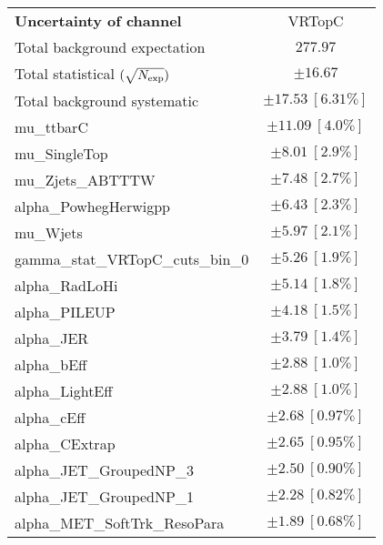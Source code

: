 
\begin{table}
\begin{center}
\setlength{\tabcolsep}{0.0pc}
\begin{tabular*}{\textwidth}{@{\extracolsep{\fill}}lc}
\noalign{\smallskip}\hline\noalign{\smallskip}
{\bf Uncertainty of channel}                                    & VRTopC            \\
\noalign{\smallskip}\hline\noalign{\smallskip}
Total background expectation             &  $277.97$       \\
\noalign{\smallskip}\hline\noalign{\smallskip}
Total statistical $(\sqrt{N_{\rm exp}})$              & $\pm 16.67$       \\
Total background systematic               & $\pm 17.53\ [6.31\%] $             \\
\noalign{\smallskip}\hline\noalign{\smallskip}
\noalign{\smallskip}\hline\noalign{\smallskip}
mu\_ttbarC         & $\pm 11.09\ [4.0\%] $       \\
mu\_SingleTop         & $\pm 8.01\ [2.9\%] $       \\
mu\_Zjets\_ABTTTW         & $\pm 7.48\ [2.7\%] $       \\
alpha\_PowhegHerwigpp         & $\pm 6.43\ [2.3\%] $       \\
mu\_Wjets         & $\pm 5.97\ [2.1\%] $       \\
gamma\_stat\_VRTopC\_cuts\_bin\_0         & $\pm 5.26\ [1.9\%] $       \\
alpha\_RadLoHi         & $\pm 5.14\ [1.8\%] $       \\
alpha\_PILEUP         & $\pm 4.18\ [1.5\%] $       \\
alpha\_JER         & $\pm 3.79\ [1.4\%] $       \\
alpha\_bEff         & $\pm 2.88\ [1.0\%] $       \\
alpha\_LightEff         & $\pm 2.88\ [1.0\%] $       \\
alpha\_cEff         & $\pm 2.68\ [0.97\%] $       \\
alpha\_CExtrap         & $\pm 2.65\ [0.95\%] $       \\
alpha\_JET\_GroupedNP\_3         & $\pm 2.50\ [0.90\%] $       \\
alpha\_JET\_GroupedNP\_1         & $\pm 2.28\ [0.82\%] $       \\
alpha\_MET\_SoftTrk\_ResoPara         & $\pm 1.89\ [0.68\%] $       \\

\end{tabular*}
\end{center}
\end{table}
